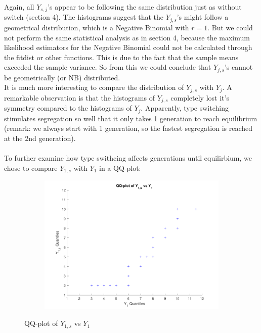 Again, all $Y_{s,j}$'s appear to be following the same distribution just as without switch (section 4). 
The histograms suggest that the $Y_{j,s}$'s might follow a geometrical distribution, which is a Negative Binomial with $r=1$. 
But we could not perform the same statistical analysis as in section 4, because the maximum likelihood estimators for the Negative Binomial could not be calculated through the fitdist or other functions. 
This is due to the fact that the sample means exceeded the sample variance. So from this we could conclude that $Y_{j,s}$'s cannot be geometrically (or NB) distributed.\\

It is much more interesting to compare the distribution of $Y_{j,s}$ with $Y_{j}$. A remarkable observation is that the histograms of $Y_{j,s}$ completely lost it's symmetry compared to the histograms of $Y_j$. 
Apparently, type switching stimulates segregation so well that it only takes 1 generation to reach equilibrium (remark: we always start with 1 generation, so the fastest segregation is reached at the 2nd generation).\\
\\ 
To further examine how type swithcing affects generations until equilirbium, we chose to compare $Y_{1,s}$ with $Y_1$ in a QQ-plot:

\begin{figure}[H]
    \centering
    \begin{subfigure}{0.8\textwidth}
        \includegraphics[width=\textwidth]{QQplotY1sw.pdf}
    \end{subfigure}
    \caption{QQ-plot of $Y_{1,s}$ vs $Y_1$}
    \label{fig:QQplotSw}
\end{figure}  

